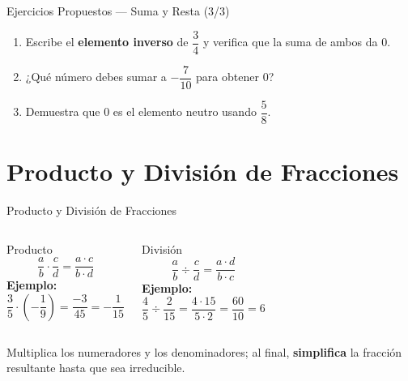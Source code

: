\documentclass[aspectratio=169]{beamer}
\begin{document}
\begin{frame}{Ejercicios Propuestos — Suma y Resta \textnormal{(3/3)}}
  \begin{mwejercicio}
    \begin{enumerate}
      \item Escribe el \textbf{elemento inverso} de $\dfrac{3}{4}$ y
            verifica que la suma de ambos da $0$.
      \item ¿Qué número debes sumar a $-\dfrac{7}{10}$ para obtener
            $0$?
      \item Demuestra que $0$ es el elemento neutro usando
            $\dfrac{5}{8}$.
    \end{enumerate}
  \end{mwejercicio}
\end{frame}

\section{Producto y División de Fracciones}

\begin{frame}{Producto y División de Fracciones}
  \begin{columns}[T]
    \begin{block}{Producto}
      \[
        \frac{a}{b} \cdot \frac{c}{d}
        = \frac{a \cdot c}{b \cdot d}
      \]
      \textbf{Ejemplo:}
      \[
        \frac{3}{5} \cdot \left(-\frac{1}{9}\right)
        = \frac{-3}{45} = -\frac{1}{15}
      \]
    \end{block}
    \begin{block}{División}
      \[
        \frac{a}{b} \div \frac{c}{d}
        = \frac{a \cdot d}{b \cdot c}
      \]
      \textbf{Ejemplo:}
      \[
        \frac{4}{5} \div \frac{2}{15}
        = \frac{4 \cdot 15}{5 \cdot 2}
        = \frac{60}{10} = 6
      \]
    \end{block}
  \end{columns}
  \vspace{4pt}
  \begin{mwpasos}[Consejo]
    Multiplica los numeradores y los denominadores; al final,
    \textbf{simplifica} la fracción resultante hasta que sea
    irreducible.
  \end{mwpasos}
\end{frame}
\end{document}
